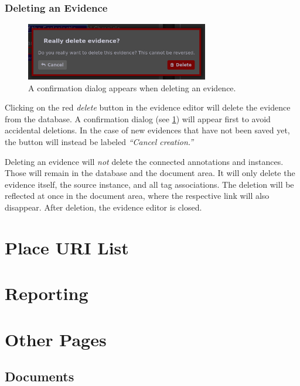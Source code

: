 \subsubsection{Deleting an Evidence}
\label{sec:evidence-deletion}

\begin{figure}[htb]
  \centering
  \includegraphics[width=8cm]{../src/assets/annotator-documentation/delete-evidence.png}

  \caption{A confirmation dialog appears when deleting an evidence.}
  \label{fig:delete-evidence}
\end{figure}

Clicking on the red \emph{delete} button in the evidence editor will delete the evidence from the database.
A confirmation dialog (see \cref{fig:delete-evidence}) will appear first to avoid accidental deletions.
In the case of new evidences that have not been saved yet, the button will instead be labeled \emph{\enquote{Cancel creation.}}

Deleting an evidence will \emph{not} delete the connected annotations and instances.
Those will remain in the database and the document area.
It will only delete the evidence itself, the source instance, and all tag associations.
The deletion will be reflected at once in the document area, where the respective link will also disappear.
After deletion, the evidence editor is closed.


\section{Place URI List}


\section{Reporting}
\label{sec:reporting}


\section{Other Pages}


\subsection{Documents}

